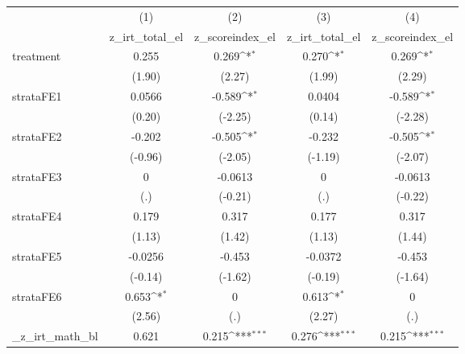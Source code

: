 {
\def\sym#1{\ifmmode^{#1}\else\(^{#1}\)\fi}
\begin{tabular}{l*{4}{c}}
\hline\hline
            &\multicolumn{1}{c}{(1)}&\multicolumn{1}{c}{(2)}&\multicolumn{1}{c}{(3)}&\multicolumn{1}{c}{(4)}\\
            &\multicolumn{1}{c}{z\_irt\_total\_el}&\multicolumn{1}{c}{z\_scoreindex\_el}&\multicolumn{1}{c}{z\_irt\_total\_el}&\multicolumn{1}{c}{z\_scoreindex\_el}\\
\hline
treatment   &       0.255         &       0.269\sym{*}  &       0.270\sym{*}  &       0.269\sym{*}  \\
            &      (1.90)         &      (2.27)         &      (1.99)         &      (2.29)         \\
[1em]
strataFE1   &      0.0566         &      -0.589\sym{*}  &      0.0404         &      -0.589\sym{*}  \\
            &      (0.20)         &     (-2.25)         &      (0.14)         &     (-2.28)         \\
[1em]
strataFE2   &      -0.202         &      -0.505\sym{*}  &      -0.232         &      -0.505\sym{*}  \\
            &     (-0.96)         &     (-2.05)         &     (-1.19)         &     (-2.07)         \\
[1em]
strataFE3   &           0         &     -0.0613         &           0         &     -0.0613         \\
            &         (.)         &     (-0.21)         &         (.)         &     (-0.22)         \\
[1em]
strataFE4   &       0.179         &       0.317         &       0.177         &       0.317         \\
            &      (1.13)         &      (1.42)         &      (1.13)         &      (1.44)         \\
[1em]
strataFE5   &     -0.0256         &      -0.453         &     -0.0372         &      -0.453         \\
            &     (-0.14)         &     (-1.62)         &     (-0.19)         &     (-1.64)         \\
[1em]
strataFE6   &       0.653\sym{*}  &           0         &       0.613\sym{*}  &           0         \\
            &      (2.56)         &         (.)         &      (2.27)         &         (.)         \\
[1em]
\_z\_irt\_math\_bl&       0.621         &       0.215\sym{***}&       0.276\sym{***}&       0.215\sym{***}\\

\end{tabular}}
